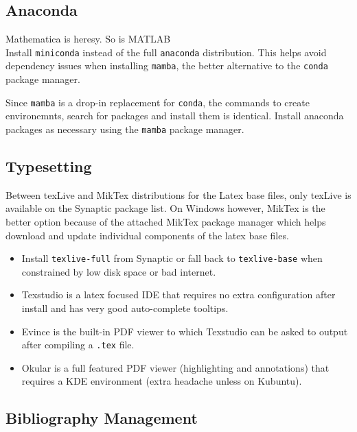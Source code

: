 \documentclass[8pt,letterpaper,twocolumn]{article}
\begin{document}
\subsection{Anaconda}

Mathematica is heresy. So is MATLAB\\

Install \texttt{miniconda} instead of the full \texttt{anaconda} distribution. 
This helps avoid dependency issues when installing \texttt{mamba}, the better alternative to the 
\texttt{conda} package manager.

Since \texttt{mamba} is a drop-in replacement for \texttt{conda}, the commands to create environemnts, search for 
packages and install them is identical. Install anaconda packages as necessary using the \texttt{mamba} package manager.





\subsection{Typesetting}

Between texLive and MikTex distributions for the Latex base files, only texLive is available on the Synaptic package list. On Windows however, MikTex is the better option because of the attached MikTex package manager which helps download and update individual components of the latex base files.

\begin{itemize}
	\item Install \texttt{texlive-full} from Synaptic or fall back to \texttt{texlive-base} when constrained by low disk space or bad internet.
	\item Texstudio is a latex focused IDE that requires no extra configuration after install and has very good auto-complete tooltips.
	\item Evince is the built-in PDF viewer to which Texstudio can be asked to output after compiling a \texttt{.tex} file. 
	\item Okular is a full featured PDF viewer (highlighting and annotations) that requires a KDE environment (extra headache unless on Kubuntu).
\end{itemize} 


\subsection{Bibliography Management}
\end{document}
